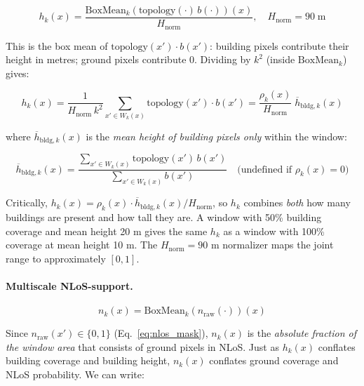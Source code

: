 \documentclass[11pt,a4paper]{article}
\begin{document}
\begin{equation}
h_k(x)=
\frac{\mathrm{BoxMean}_k\!\left(\mathrm{topology}(\cdot)\,b(\cdot)\right)(x)}
{H_{\mathrm{norm}}},
\quad H_{\mathrm{norm}} = 90 \;\mathrm{m}
\label{eq:h_k}
\end{equation}

This is the box mean of $\mathrm{topology}(x')\cdot b(x')$:
building pixels contribute their height in metres; ground pixels contribute
0. Dividing by $k^2$ (inside $\mathrm{BoxMean}_k$) gives:

\begin{equation}
h_k(x)=
\frac{1}{H_{\mathrm{norm}}\,k^2}
\sum_{x'\in W_k(x)}
\mathrm{topology}(x')\cdot b(x')
=
\frac{\rho_k(x)}{H_{\mathrm{norm}}}\;\overline{h}_{\mathrm{bldg},k}(x)
\label{eq:h_k_interp}
\end{equation}

where $\overline{h}_{\mathrm{bldg},k}(x)$ is the \emph{mean height of
building pixels only} within the window:

\begin{equation}
\overline{h}_{\mathrm{bldg},k}(x)
=
\frac{\displaystyle\sum_{x'\in W_k(x)} \mathrm{topology}(x')\,b(x')}
     {\displaystyle\sum_{x'\in W_k(x)} b(x')}
\quad\text{(undefined if }\rho_k(x)=0\text{)}
\label{eq:mean_bldg_height}
\end{equation}

Critically, $h_k(x) = \rho_k(x)\cdot\overline{h}_{\mathrm{bldg},k}(x)/H_{\mathrm{norm}}$,
so $h_k$ combines \emph{both} how many buildings are present and how tall they
are. A window with 50\% building coverage and mean height 20 m gives the same
$h_k$ as a window with 100\% coverage at mean height 10 m. The $H_{\mathrm{norm}}
= 90$ m normalizer maps the joint range to approximately $[0, 1]$.

\paragraph{Multiscale NLoS-support.}

\begin{equation}
n_k(x)=\mathrm{BoxMean}_k\!\left(n_{\mathrm{raw}}(\cdot)\right)(x)
\label{eq:n_k}
\end{equation}

Since $n_{\mathrm{raw}}(x') \in \{0,1\}$ (Eq.~\ref{eq:nlos_mask}),
$n_k(x)$ is the \emph{absolute fraction of the window area} that consists of
ground pixels in NLoS. Just as $h_k(x)$ conflates building coverage and building
height, $n_k(x)$ conflates ground coverage and NLoS probability. We can write:
\end{document}
